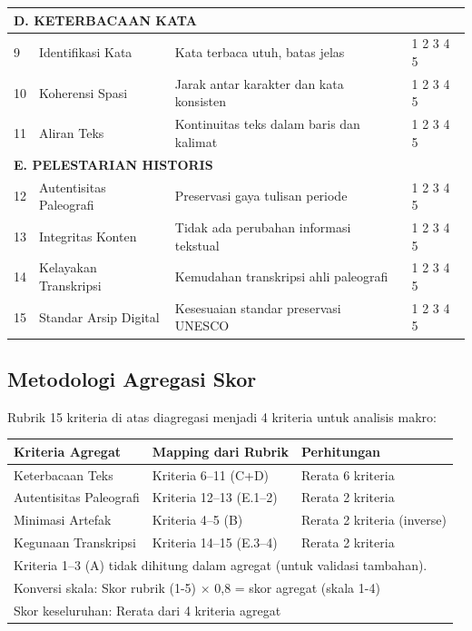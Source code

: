 \documentclass[12pt,a4paper]{article}
\begin{document}
\begin{longtable}{|p{0.5cm}|p{3.5cm}|p{7cm}|p{1.5cm}|}
\multicolumn{4}{|l|}{\textbf{D. KETERBACAAN KATA}} \\
\hline
9 & Identifikasi Kata & Kata terbaca utuh, batas jelas & 1 2 3 4 5 \\
\hline
10 & Koherensi Spasi & Jarak antar karakter dan kata konsisten & 1 2 3 4 5 \\
\hline
11 & Aliran Teks & Kontinuitas teks dalam baris dan kalimat & 1 2 3 4 5 \\
\hline

\multicolumn{4}{|l|}{\textbf{E. PELESTARIAN HISTORIS}} \\
\hline
12 & Autentisitas Paleografi & Preservasi gaya tulisan periode & 1 2 3 4 5 \\
\hline
13 & Integritas Konten & Tidak ada perubahan informasi tekstual & 1 2 3 4 5 \\
\hline
14 & Kelayakan Transkripsi & Kemudahan transkripsi ahli paleografi & 1 2 3 4 5 \\
\hline
15 & Standar Arsip Digital & Kesesuaian standar preservasi UNESCO & 1 2 3 4 5 \\
\hline

\end{longtable}

\vspace{2em}


\subsection*{Metodologi Agregasi Skor}

Rubrik 15 kriteria di atas diagregasi menjadi 4 kriteria untuk analisis makro:

\begin{table}[h]
\centering
\small
\begin{tabular}{|l|l|l|}
\hline
\textbf{Kriteria Agregat} & \textbf{Mapping dari Rubrik} & \textbf{Perhitungan} \\
\hline
Keterbacaan Teks & Kriteria 6--11 (C+D) & Rerata 6 kriteria \\
Autentisitas Paleografi & Kriteria 12--13 (E.1--2) & Rerata 2 kriteria \\
Minimasi Artefak & Kriteria 4--5 (B) & Rerata 2 kriteria (inverse) \\
Kegunaan Transkripsi & Kriteria 14--15 (E.3--4) & Rerata 2 kriteria \\
\hline
\multicolumn{3}{l}{\footnotesize Kriteria 1--3 (A) tidak dihitung dalam agregat (untuk validasi tambahan).} \\
\multicolumn{3}{l}{\footnotesize Konversi skala: Skor rubrik (1-5) $\times$ 0,8 = skor agregat (skala 1-4)} \\
\multicolumn{3}{l}{\footnotesize Skor keseluruhan: Rerata dari 4 kriteria agregat} \\
\end{tabular}
\end{table}
\end{document}
